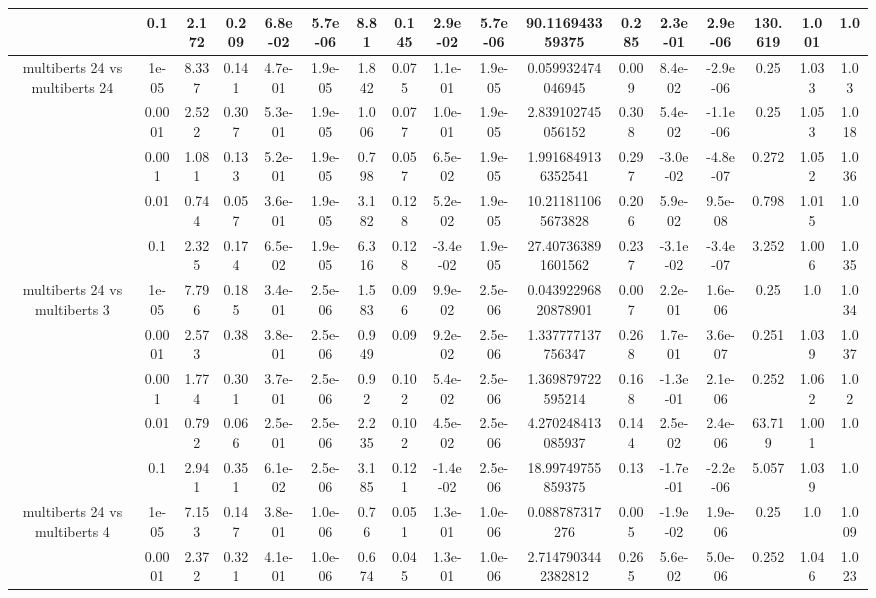 \begin{tabular}{|c|c|c|c|c|c|c|c|c|c|c|c|c|c|c|c|c|}
 & 0.1 & 2.172 & 0.209 & 6.8e-02 & 5.7e-06 & 8.81 & 0.145 & 2.9e-02 & 5.7e-06 & 90.116943359375 & 0.285 & 2.3e-01 & 2.9e-06 & 130.619 & 1.001 & 1.0 \\
\hline
\multirow{5}{*}{multiberts 24 vs multiberts 24} & 1e-05 & 8.337 & 0.141 & 4.7e-01 & 1.9e-05 & 1.842 & 0.075 & 1.1e-01 & 1.9e-05 & 0.059932474046945 & 0.009 & 8.4e-02 & -2.9e-06 & 0.25 & 1.033 & 1.03 \\
 & 0.0001 & 2.522 & 0.307 & 5.3e-01 & 1.9e-05 & 1.006 & 0.077 & 1.0e-01 & 1.9e-05 & 2.839102745056152 & 0.308 & 5.4e-02 & -1.1e-06 & 0.25 & 1.053 & 1.018 \\
 & 0.001 & 1.081 & 0.133 & 5.2e-01 & 1.9e-05 & 0.798 & 0.057 & 6.5e-02 & 1.9e-05 & 1.9916849136352541 & 0.297 & -3.0e-02 & -4.8e-07 & 0.272 & 1.052 & 1.036 \\
 & 0.01 & 0.744 & 0.057 & 3.6e-01 & 1.9e-05 & 3.182 & 0.128 & 5.2e-02 & 1.9e-05 & 10.211811065673828 & 0.206 & 5.9e-02 & 9.5e-08 & 0.798 & 1.015 & 1.0 \\
 & 0.1 & 2.325 & 0.174 & 6.5e-02 & 1.9e-05 & 6.316 & 0.128 & -3.4e-02 & 1.9e-05 & 27.407363891601562 & 0.237 & -3.1e-02 & -3.4e-07 & 3.252 & 1.006 & 1.035 \\
\hline
\multirow{5}{*}{multiberts 24 vs multiberts 3} & 1e-05 & 7.796 & 0.185 & 3.4e-01 & 2.5e-06 & 1.583 & 0.096 & 9.9e-02 & 2.5e-06 & 0.04392296820878901 & 0.007 & 2.2e-01 & 1.6e-06 & 0.25 & 1.0 & 1.034 \\
 & 0.0001 & 2.573 & 0.38 & 3.8e-01 & 2.5e-06 & 0.949 & 0.09 & 9.2e-02 & 2.5e-06 & 1.337777137756347 & 0.268 & 1.7e-01 & 3.6e-07 & 0.251 & 1.039 & 1.037 \\
 & 0.001 & 1.774 & 0.301 & 3.7e-01 & 2.5e-06 & 0.92 & 0.102 & 5.4e-02 & 2.5e-06 & 1.369879722595214 & 0.168 & -1.3e-01 & 2.1e-06 & 0.252 & 1.062 & 1.02 \\
 & 0.01 & 0.792 & 0.066 & 2.5e-01 & 2.5e-06 & 2.235 & 0.102 & 4.5e-02 & 2.5e-06 & 4.270248413085937 & 0.144 & 2.5e-02 & 2.4e-06 & 63.719 & 1.001 & 1.0 \\
 & 0.1 & 2.941 & 0.351 & 6.1e-02 & 2.5e-06 & 3.185 & 0.121 & -1.4e-02 & 2.5e-06 & 18.99749755859375 & 0.13 & -1.7e-01 & -2.2e-06 & 5.057 & 1.039 & 1.0 \\
\hline
\multirow{5}{*}{multiberts 24 vs multiberts 4} & 1e-05 & 7.153 & 0.147 & 3.8e-01 & 1.0e-06 & 0.76 & 0.051 & 1.3e-01 & 1.0e-06 & 0.088787317276 & 0.005 & -1.9e-02 & 1.9e-06 & 0.25 & 1.0 & 1.009 \\
 & 0.0001 & 2.372 & 0.321 & 4.1e-01 & 1.0e-06 & 0.674 & 0.045 & 1.3e-01 & 1.0e-06 & 2.7147903442382812 & 0.265 & 5.6e-02 & 5.0e-06 & 0.252 & 1.046 & 1.023 \\

\end{tabular}
